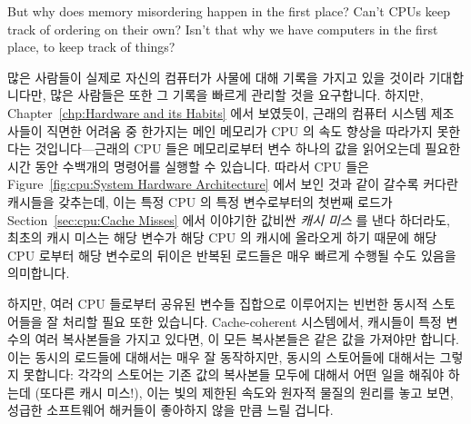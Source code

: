 But why does memory misordering happen in the first place?
Can't CPUs keep track of ordering on their own?
Isn't that why we have computers in the first place, to keep track of things?
\fi

많은 사람들이 실제로 자신의 컴퓨터가 사물에 대해 기록을 가지고 있을 것이라
기대합니다만, 많은 사람들은 또한 그 기록을 빠르게 관리할 것을 요구합니다.
하지만, Chapter~\ref{chp:Hardware and its Habits} 에서 보였듯이, 근래의 컴퓨터
시스템 제조사들이 직면한 어려움 중 한가지는 메인 메모리가 CPU 의 속도 향상을
따라가지 못한다는 것입니다---근래의 CPU 들은 메모리로부터 변수 하나의 값을
읽어오는데 필요한 시간 동안 수백개의 명령어를 실행할 수 있습니다.
따라서 CPU 들은
Figure~\ref{fig:cpu:System Hardware Architecture} 에서 보인 것과 같이
갈수록 커다란 캐시들을 갖추는데, 이는 특정 CPU 의 특정 변수로부터의 첫번째
로드가
Section~\ref{sec:cpu:Cache Misses} 에서 이야기한 값비싼 \emph{캐시 미스} 를
낸다 하더라도, 최초의 캐시 미스는 해당 변수가 해당 CPU 의 캐시에 올라오게 하기
때문에 해당 CPU 로부터 해당 변수로의 뒤이은 반복된 로드들은 매우 빠르게
수행될 수도 있음을 의미합니다.

하지만, 여러 CPU 들로부터 공유된 변수들 집합으로 이루어지는 빈번한 동시적
스토어들을 잘 처리할 필요 또한 있습니다.
Cache-coherent 시스템에서, 캐시들이 특정 변수의 여러 복사본들을 가지고 있다면,
이 모든 복사본들은 같은 값을 가져야만 합니다.
이는 동시의 로드들에 대해서는 매우 잘 동작하지만, 동시의 스토어들에 대해서는
그렇지 못합니다:  각각의 스토어는 기존 값의 복사본들 모두에 대해서 어떤 일을
해줘야 하는데 (또다른 캐시 미스!), 이는 빛의 제한된 속도와 원자적 물질의 원리를
놓고 보면, 성급한 소프트웨어 해커들이 좋아하지 않을 만큼 느릴 겁니다.
\iffalse

